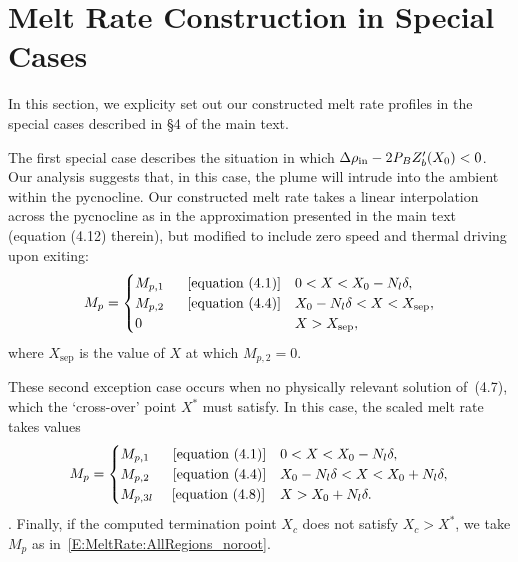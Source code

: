 \documentclass{article}
\begin{document}
\section{Melt Rate Construction in Special Cases}
In this section, we explicity set out our constructed melt rate profiles in the special cases described in \S4 of the main text.

The first special case describes the situation in which $\Delta \rho_{\text{in}} - 2 \textit{P}_B Z_b'(X_0) < 0$. Our analysis suggests that, in this case, the plume will intrude into the ambient within the pycnocline. Our constructed melt rate takes a linear interpolation across the pycnocline as in the approximation presented in the main text (equation (4.12) therein), but modified to include zero speed and thermal driving upon exiting:
\begin{equation}
M_{p} = \begin{cases} 
M_{p,1~} \text{~\quad [equation~(4.1)]}  & 0 < X < X_0 - N_l \delta,\\
M_{p,2~} \text{~\quad [equation~(4.4)]} & X_0 - N_l \delta < X <X_{\text{sep}} ,\\
0  &  X > X_{\text{sep}},\\
\end{cases}
\end{equation}
where $X_{\text{sep}}$ is the value of $X$ at which $M_{p,2} = 0$.

These second exception case occurs when no physically relevant solution of~(4.7), which the `cross-over' point $X^*$ must satisfy. In this case,  the scaled melt rate takes values
\begin{equation}\label{E:MeltRate:AllRegions_noroot}
M_{p} = \begin{cases} 
M_{p,1~} \text{~\quad [equation~(4.1)]}  & 0 < X < X_0 - N_l \delta,\\
M_{p,2~} \text{~\quad [equation~(4.4)]} & X_0 - N_l \delta < X < X_0 + N_l \delta,\\
M_{p,3l~} \text{\quad [equation~(4.8)]} &  X > X_0 + N_l \delta.
\end{cases}
\end{equation}.
Finally, if the computed termination point $X_c$ does not satisfy $X_c > X^*$, we take $M_p$ as in~\eqref{E:MeltRate:AllRegions_noroot}.
\end{document}
